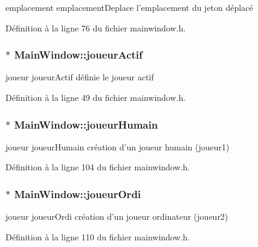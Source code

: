 emplacement emplacement\-Deplace  l'emplacement du jeton déplacé 



Définition à la ligne 76 du fichier mainwindow.\-h.

\hypertarget{class_main_window_a267d43ab6a839ee5f91869efa84cf271}{
\subsubsection[{joueur\-Actif}]{ $\ast$ Main\-Window\-::joueur\-Actif}}\label{class_main_window_a267d43ab6a839ee5f91869efa84cf271}


joueur joueur\-Actif  définie le joueur actif 



Définition à la ligne 49 du fichier mainwindow.\-h.

\hypertarget{class_main_window_a5d1e13ecdb63fa88e114565df70613aa}{
\subsubsection[{joueur\-Humain}]{ $\ast$ Main\-Window\-::joueur\-Humain}}\label{class_main_window_a5d1e13ecdb63fa88e114565df70613aa}


joueur joueur\-Humain  création d'un joueur humain (joueur1) 



Définition à la ligne 104 du fichier mainwindow.\-h.

\hypertarget{class_main_window_a7ce2a641dae02c27242c9bca5ec2174f}{
\subsubsection[{joueur\-Ordi}]{ $\ast$ Main\-Window\-::joueur\-Ordi}}\label{class_main_window_a7ce2a641dae02c27242c9bca5ec2174f}


joueur joueur\-Ordi  création d'un joueur ordinateur (joueur2) 



Définition à la ligne 110 du fichier mainwindow.\-h.

